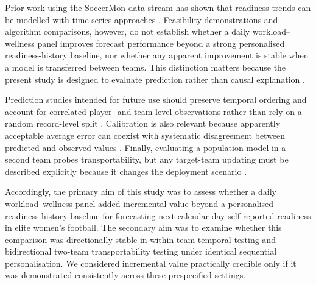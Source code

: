 Prior work using the SoccerMon data stream has shown that readiness trends can be modelled with time-series approaches \citep{Wiik2019,Kulakou2022}. Feasibility demonstrations and algorithm comparisons, however, do not establish whether a daily workload--wellness panel improves forecast performance beyond a strong personalised readiness-history baseline, nor whether any apparent improvement is stable when a model is transferred between teams. This distinction matters because the present study is designed to evaluate prediction rather than causal explanation \citep{Shmueli2010}.

Prediction studies intended for future use should preserve temporal ordering and account for correlated player- and team-level observations rather than rely on a random record-level split \citep{Bergmeir2018,Roberts2017,Debray2023TRIPODCluster}. Calibration is also relevant because apparently acceptable average error can coexist with systematic disagreement between predicted and observed values \citep{VanCalster2019,Collins2024}. Finally, evaluating a population model in a second team probes transportability, but any target-team updating must be described explicitly because it changes the deployment scenario \citep{Janssen2008}.

Accordingly, the primary aim of this study was to assess whether a daily workload--wellness panel added incremental value beyond a personalised readiness-history baseline for forecasting next-calendar-day self-reported readiness in elite women's football. The secondary aim was to examine whether this comparison was directionally stable in within-team temporal testing and bidirectional two-team transportability testing under identical sequential personalisation. We considered incremental value practically credible only if it was demonstrated consistently across these prespecified settings.
